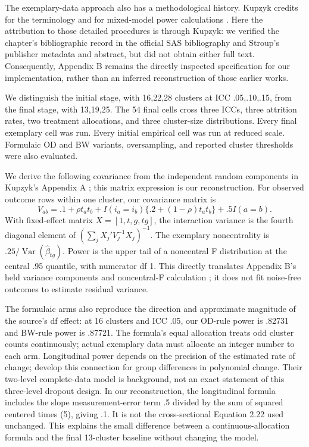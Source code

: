 \documentclass[11pt]{article}
\begin{document}
The exemplary-data approach also has a methodological history. Kupzyk credits \citet{obrien1993} for the terminology and \citet{stroup2002} for mixed-model power calculations \citep[pp.~53--56]{kupzyk2011}. Here the attribution to those detailed procedures is through Kupzyk: we verified the chapter's bibliographic record in the official SAS bibliography and Stroup's publisher metadata and abstract, but did not obtain either full text. Consequently, Appendix B remains the directly inspected specification for our implementation, rather than an inferred reconstruction of those earlier works.

We distinguish the initial stage, with 16,22,28 clusters at ICC .05,.10,.15, from the final stage, with 13,19,25. The 54 final cells cross three ICCs, three attrition rates, two treatment allocations, and three cluster-size distributions. Every final exemplary cell was run. Every initial empirical cell was run at reduced scale. Formulaic OD and BW variants, oversampling, and reported cluster thresholds were also evaluated.

We derive the following covariance from the independent random components in Kupzyk's Appendix A \citep[pp.~124--126]{kupzyk2011}; this matrix expression is our reconstruction. For observed outcome rows within one cluster, our covariance matrix is
\[
 V_{ab}=.1+\rho t_a t_b+I(i_a=i_b)\{.2+(1-\rho)t_at_b\}+.5I(a=b).
\]
With fixed-effect matrix $X=[1, t, g, tg]$, the interaction variance is the fourth diagonal element of $(\sum_j X_j'V_j^{-1}X_j)^{-1}$. The exemplary noncentrality is $.25/\operatorname{Var}(\widehat\beta_{tg})$. Power is the upper tail of a noncentral F distribution at the central .95 quantile, with numerator df 1. This directly translates Appendix B's held variance components and noncentral-F calculation \citep[pp.~127--129]{kupzyk2011}; it does not fit noise-free outcomes to estimate residual variance.

The formulaic arms also reproduce the direction and approximate magnitude of the source's df effect: at 16 clusters and ICC .05, our OD-rule power is .82731 and BW-rule power is .87721. The formula's equal allocation treats odd cluster counts continuously; actual exemplary data must allocate an integer number to each arm. Longitudinal power depends on the precision of the estimated rate of change; \citet{raudenbush2001} develop this connection for group differences in polynomial change. Their two-level complete-data model is background, not an exact statement of this three-level dropout design. In our reconstruction, the longitudinal formula includes the slope measurement-error term .5 divided by the sum of squared centered times (5), giving .1. It is not the cross-sectional Equation 2.22 used unchanged. This explains the small difference between a continuous-allocation formula and the final 13-cluster baseline without changing the model.
\end{document}
